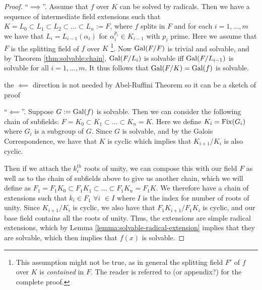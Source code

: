 \begin{proof}
	``$\implies $''. Assume that $f$ over $K$ can be solved by radicals. Then we have a sequence of intermediate field extensions such that $K = L_0 \subset L_1 \subset L_2 \subset ... \subset L_n :=F$, where $f$ splits in $F$ and for each $i = 1, \dots, m$ we have that  $L_i = L_{i-1} (\alpha_i)$ for $\alpha_i ^ {p_i} \in K_{i-1}$ with $p_i$ prime. Here we assume that $F$ is the splitting field of $f$ over $K$ \footnote{This assumption might not be true, as in general the splitting field $F'$ of $f$ over $K$ is \textit{contained} in $F$. The reader is referred to \cite{Stewart} (\TODO or appendix?) for the complete proof. }. Now $\operatorname{Gal}(F / F)$ is trivial and solvable, and by Theorem \ref{thm:solvable:chain}, $\operatorname{Gal}(F / L_i)$ is solvable iff $\operatorname{Gal}(F / L_{i-1})$ is solvable for all $i = 1, \dots, m$. It thus follows that $\operatorname{Gal}(F/ K) = \operatorname{Gal}(f)$ is solvable. 
	
	
	\TODO the $\impliedby$ direction is not needed by Abel-Ruffini Theorem so it can be a sketch of proof
	
	``$\impliedby$''. Suppose $G :=  \operatorname{Gal}(f)$ is solvable. Then we can consider the following chain of subfields: $F=K_0\subset K_1 \subset ... \subset K_n = K$. Here we define $K_i = \operatorname{Fix}(G_i)$ where $G_i$ is a subgroup of $G$.
	Since $G$ is solvable, and by the Galois Correspondence, we have that $K$ is cyclic which implies that $K_{i+1}/K_i$ is also cyclic.
	
	Then if we attach the $k_i^{th}$ roots of unity, we can compose this with our field $F$ as well as to the chain of subfields above to give us another chain, which we will define as $F_1 = F_1K_0 \subset F_1K_1 \subset ... \subset F_1K_n = F_1K$. We therefore have a chain of extensions such that $k_i \in F_1$ $\forall i$ \hspace{0.1cm} $\in I $ where $I$ is the index for number of roots of unity. Since $K_{i+1}/K_i$ is cyclic, we also have that $F_1K_{i+1}/F_1K_i$ is cyclic, and our base field contains all the roots of unity. Thus, the extensions are simple radical extensions, which by Lemma \ref{lemma:solvable-radical-extension} implies that they are solvable, which then implies that $f(x)$ is solvable.
\end{proof}


